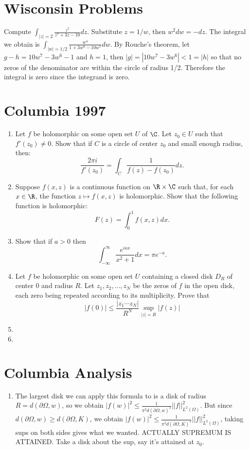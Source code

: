 \documentclass[11pt]{book}
\theoremstyle{definition}
\begin{document}
\section{Wisconsin Problems}
Compute $\int_{|z|=2} \frac{z^5}{z^7+3z-10}dz$. Substitute $z=1/w$, then $w^2dw=-dz$. The integral we obtain is $\int_{|w|=1/2} \frac{w^4}{1+3w^6-10w^7}dw$. By Rouche's theorem, let $g-h=10w^7-3w^6-1$ and $h=1$, then $|g|=|10w^7-3w^6| < 1 = |h|$ so that no zeros of the denominator are within the circle of radius 1/2. Therefore the integral is zero since the integrand is zero.
\section{Columbia 1997}
\begin{enumerate}
\item Let $f$ be holomorphic on some open set $U$ of $\C$. Let $z_0\in U$ such that $f'(z_0)\neq 0$. Show that if $C$ is a circle of center $z_0$ and small enough radius, then:
\[
\frac{2\pi i}{f'(z_0)}=\int_C \frac{1}{f(z)-f(z_0)}dz.
\]
\item Suppose $f(x,z)$ is a continuous function on $\R\times\C$ such that, for each $x\in\R$, the function $z\mapsto f(x,z)$ is holomorphic. Show that the following function is holomorphic:
\[
F(z)=\int_0^1 f(x,z)dx.
\]
\item Show that if $a>0$ then
\[
\int_{-\infty}^{\infty}\frac{e^{iax}}{x^2+1}dx=\pi e^{-a}.
\]
\item Let $f$ be holomorphic on some open set $U$ containing a closed disk $D_R$ of center 0 and radius $R$. Let $z_1,z_2,\dotsc,z_N$ be the zeros of $f$ in the open disk, each zero being repeated according to its multiplicity. Prove that
\[
|f(0)|\leq\frac{|z_1\cdots z_N|}{R^N}\sup_{|z|=R}|f(z)|
\]
\item
\item
\end{enumerate}
\section{Columbia Analysis}
\begin{enumerate}
\item The largest disk we can apply this formula to is a disk of radius $R=d(\partial\Omega,w)$, so we obtain $|f(w)|^2\leq\frac{1}{\pi^2 d(\partial\Omega,w)^2}||f||^2_{L^2(\Omega)}$. But since $d(\partial\Omega,w)\geq d(\partial\Omega,K)$, we obtain $|f(w)|^2\leq\frac{1}{\pi^2 d(\partial\Omega,K)^2}||f||^2_{L^2(\Omega)}$, taking sups on both sides gives what we wanted. ACTUALLY SUPREMUM IS ATTAINED. Take a disk about the sup, say it's attained at $z_0$.
\end{enumerate}
\end{document}
